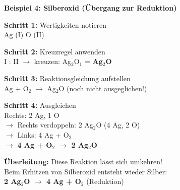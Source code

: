 \documentclass[11pt, a4paper]{article}
\newcommand{\abschnitt}[1]{%
    \vspace{10pt}%
    \noindent{\large\bfseries\textcolor{fachfarbe}{#1}}%
    \vspace{6pt}%
    \nopagebreak[4]%
}
\begin{document}
\begin{loesungbox}
\textbf{Beispiel 4: Silberoxid (Übergang zur Reduktion)}

\textbf{Schritt 1:} Wertigkeiten notieren\\
Ag (I) \quad O (II)

\textbf{Schritt 2:} Kreuzregel anwenden\\
I : II $\rightarrow$ kreuzen: Ag$_2$O$_1$ = \textbf{Ag$_2$O}

\textbf{Schritt 3:} Reaktionsgleichung aufstellen\\
Ag + O$_2$ $\rightarrow$ Ag$_2$O \quad (noch nicht ausgeglichen!)

\textbf{Schritt 4:} Ausgleichen\\
Rechts: 2 Ag, 1 O\\
$\rightarrow$ Rechts verdoppeln: 2 Ag$_2$O (4 Ag, 2 O)\\
$\rightarrow$ Links: 4 Ag + O$_2$\\
$\rightarrow$ \textbf{4 Ag + O$_2$ $\rightarrow$ 2 Ag$_2$O}

\vspace{0.5em}
\textcolor{fachfarbe}{\textbf{Überleitung:}} Diese Reaktion lässt sich umkehren!\\
Beim Erhitzen von Silberoxid entsteht wieder Silber:\\
\textbf{2 Ag$_2$O $\rightarrow$ 4 Ag + O$_2$} \quad (Reduktion)
\end{loesungbox}

\vspace{1em}


\abschnitt{Häufige Fehler}
\end{document}

